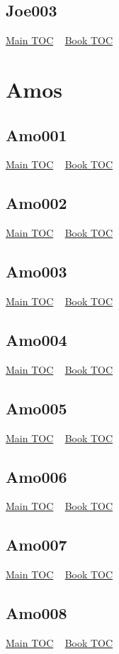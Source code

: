 \documentclass{book}
\begin{document}
  \section{Joe003}\hyperlink{toc}{Main TOC} ~ \hyperref[subsec:Joe]{Book TOC} 
  \chapter{Amos} \label{subsec:Amo} \begin{multicols}{2} \minitoc \end{multicols}
  \section{Amo001}\hyperlink{toc}{Main TOC} ~ \hyperref[subsec:Amo]{Book TOC} 
  \section{Amo002}\hyperlink{toc}{Main TOC} ~ \hyperref[subsec:Amo]{Book TOC} 
  \section{Amo003}\hyperlink{toc}{Main TOC} ~ \hyperref[subsec:Amo]{Book TOC} 
  \section{Amo004}\hyperlink{toc}{Main TOC} ~ \hyperref[subsec:Amo]{Book TOC} 
  \section{Amo005}\hyperlink{toc}{Main TOC} ~ \hyperref[subsec:Amo]{Book TOC} 
  \section{Amo006}\hyperlink{toc}{Main TOC} ~ \hyperref[subsec:Amo]{Book TOC} 
  \section{Amo007}\hyperlink{toc}{Main TOC} ~ \hyperref[subsec:Amo]{Book TOC} 
  \section{Amo008}\hyperlink{toc}{Main TOC} ~ \hyperref[subsec:Amo]{Book TOC} 
\end{document}
